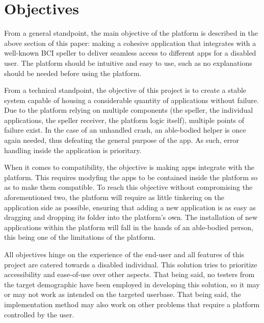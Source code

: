 \section{Objectives}\label{sect:objectives}
\hspace{\parindent} From a general standpoint, the main objective of the platform is described in the above section of this paper: making a cohesive application that integrates with a well-known BCI speller to deliver seamless access to different apps for a disabled user. The platform should be intuitive and easy to use, such as no explanations should be needed before using the platform. 

\vspace*{2mm}
\hspace{\parindent} From a technical standpoint, the objective of this project is to create a stable system capable of housing a considerable quantity of applications without failure. Due to the platform relying on multiple components (the speller, the individual applications, the speller receiver, the platform logic itself), multiple points of failure exist. In the case of an unhandled crash, an able-bodied helper is once again needed, thus defeating the general purpose of the app. As such, error handling inside the application is prioritary. 

\vspace*{2mm}
\hspace{\parindent} When it comes to compatibility, the objective is making apps integrate with the platform. This requires modyfing the apps to be contained inside the platform so as to make them compatible. To reach this objective without compromising the aforementioned two, the platform will require as little tinkering on the application side as possible, ensuring that adding a new application is as easy as dragging and dropping its folder into the platform's own. The installation of new applications within the platform will fall in the hands of an able-bodied person, this being one of the limitations of the platform. 

\vspace*{2mm}
\hspace{\parindent} All objectives hinge on the experience of the end-user and all features of this project are catered towards a disabled individual. This solution tries to prioritize accessibility and ease-of-use over other aspects. That being said, no testers from the target demographic have been employed in developing this solution, so it may or may not work as intended on the targeted userbase. That being said, the implementation method may also work on other problems that require a platform controlled by the user.

